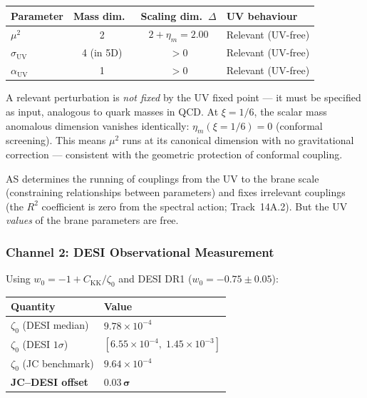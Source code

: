 \begin{center}
\small
\begin{tabular}{l c c l}
\hline
Parameter & Mass dim.\ & Scaling dim.\ $\Delta$ & UV behaviour \\
\hline
$\mu^2$              & 2 & $2 + \eta_m = 2.00$ & Relevant (UV-free) \\
$\sigma_{\mathrm{UV}}$ & 4 (in 5D) & $> 0$ & Relevant (UV-free) \\
$\alpha_{\mathrm{UV}}$ & 1 & $> 0$ & Relevant (UV-free) \\
\hline
\end{tabular}
\end{center}

\noindent
A relevant perturbation is \emph{not fixed} by the UV fixed point --- it must be specified as input, analogous to quark masses in QCD. At $\xi = 1/6$, the scalar mass anomalous dimension vanishes identically: $\eta_m(\xi{=}1/6) = 0$ (conformal screening). This means $\mu^2$ runs at its canonical dimension with no gravitational correction --- consistent with the geometric protection of conformal coupling.

AS determines the running of couplings from the UV to the brane scale (constraining relationships between parameters) and fixes irrelevant couplings (the $R^2$ coefficient is zero from the spectral action; Track~14A.2). But the UV \emph{values} of the brane parameters are free.

\subsubsection{Channel 2: DESI Observational Measurement}

Using $w_0 = -1 + C_\mathrm{KK}/\zeta_0$ and DESI DR1 ($w_0 = -0.75 \pm 0.05$):

\begin{center}
\begin{tabular}{l l}
\hline
Quantity & Value \\
\hline
$\zeta_0$ (DESI median)      & $9.78 \times 10^{-4}$ \\
$\zeta_0$ (DESI $1\sigma$)   & $[6.55 \times 10^{-4},\; 1.45 \times 10^{-3}]$ \\
$\zeta_0$ (JC benchmark)     & $9.64 \times 10^{-4}$ \\
\textbf{JC--DESI offset}     & $\mathbf{0.03\,\sigma}$ \\
\hline
\end{tabular}
\end{center}

